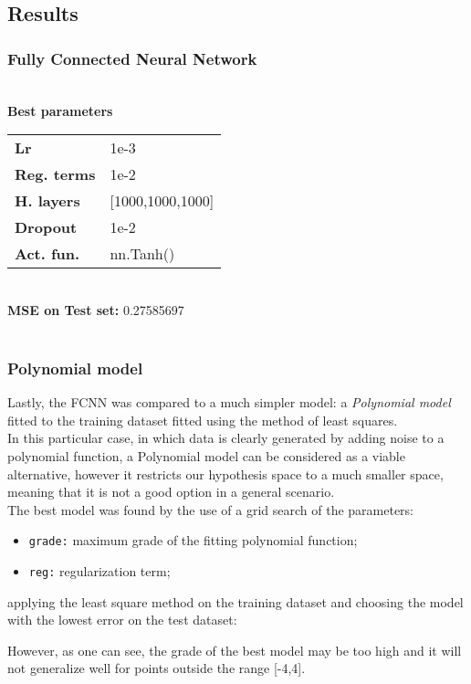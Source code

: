 \documentclass[11pt,a4paper,twocolumn]{IEEEtran}
\newcommand{\thinsepline}{\noindent\makebox[\linewidth]{\rule{7.5cm}{0.02pt}}}
\newcommand{\thinnersepline}{\noindent\makebox[\linewidth]{\rule{7.5cm}{0.01pt}}}
\begin{document}
			\subsection{\textbf{Results}}
				\subsubsection{Fully Connected Neural Network}
				\thinsepline\\
				\textbf{Best parameters}\medskip\\
				\begin{tabular}{ll}
					\textbf{Lr}	& 1e-3 \\
					\textbf{Reg. terms}	& 1e-2 \\
					\textbf{H. layers} & [1000,1000,1000] \\
					\textbf{Dropout} & 1e-2 \\
					\textbf{Act. fun.} & nn.Tanh()
				\end{tabular}
				\thinnersepline\\
				\textbf{MSE on Test set:} 0.27585697\vspace*{-.2cm}\\
				\thinsepline\\
				\subsubsection{Polynomial model}
					Lastly, the FCNN was compared to a much simpler model: a \textit{Polynomial model} fitted to the training dataset fitted using the method of least squares.\\
					In this particular case, in which data is clearly generated by adding noise to a polynomial function, a Polynomial model can be considered as a viable alternative, however it restricts our hypothesis space to a much smaller space, meaning that it is not a good option in a general scenario.\medskip\\
					The best model was found by the use of a grid search of the parameters:
					\begin{itemize}
						\item \texttt{grade:} maximum grade of the fitting polynomial function;
						\item \texttt{reg:} regularization term;
					\end{itemize}
					applying the least square method on the training dataset and choosing the model with the lowest error on the test dataset:
					\vspace*{-.5cm}
					\begin{figure}[h]
						\centering
						
					\end{figure}
					However, as one can see, the grade of the best model may be too high and it will not generalize well for points outside the range [-4,4].
\end{document}
